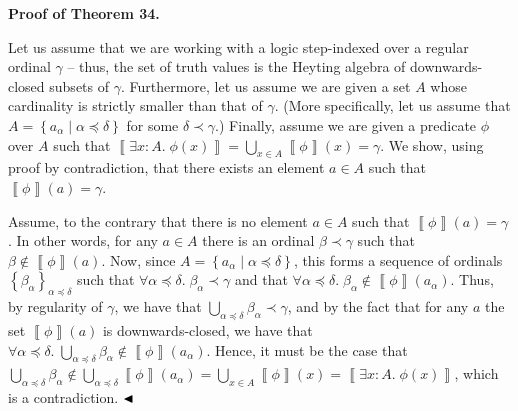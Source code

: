  
 
\par\medskip\noindent\textbf{Proof of Theorem 34.}\par
 
 
Let us assume that we are working with a logic step-indexed over a regular ordinal $\gamma$ – thus, the set of truth values is the Heyting algebra of downwards-closed subsets of $\gamma$. Furthermore, let us assume we are given a set $A$ whose cardinality is strictly smaller than that of $\gamma$. (More specifically, let us assume that $A=\left\{a_{\alpha}\middle|\alpha\preceq\delta\right\}$ for some $\delta\prec\gamma$.) Finally, assume we are given a predicate $\phi$ over $A$ such that $\left\llbracket\exists x:A.\;\phi(x)\right\rrbracket=\bigcup_{x\in A}\left\llbracket\phi\right\rrbracket(x)=\gamma$. We show, using proof by contradiction, that there exists an element $a\in A$ such that $\left\llbracket\phi\right\rrbracket(a)=\gamma$.\par
 
 
 
Assume, to the contrary that there is no element $a\in A$ such that $\left\llbracket\phi\right\rrbracket(a)=\gamma$. In other words, for any $a\in A$ there is an ordinal $\beta\prec\gamma$ such that $\beta\not\in\left\llbracket\phi\right\rrbracket(a)$. Now, since $A=\left\{a_{\alpha}\middle|\alpha\preceq\delta\right\}$, this forms a sequence of ordinals $\left\{\beta_{\alpha}\right\}_{\alpha\preceq\delta}$ such that $\forall\alpha\preceq\delta.\;\beta_{\alpha}\prec\gamma$ and that $\forall\alpha\preceq\delta.\;\beta_{\alpha}\not\in\left\llbracket\phi\right\rrbracket(a_{\alpha})$. Thus, by regularity of $\gamma$, we have that $\bigcup_{\alpha\preceq\delta}\beta_{\alpha}\prec\gamma$, and by the fact that for any $a$ the set $\left\llbracket\phi\right\rrbracket(a)$ is downwards-closed, we have that $\forall\alpha\preceq\delta.\;\bigcup_{\alpha\preceq\delta}\beta_{\alpha}\not\in\left\llbracket\phi\right\rrbracket(a_{\alpha})$. Hence, it must be the case that $\bigcup_{\alpha\preceq\delta}\beta_{\alpha}\not\in\bigcup_{\alpha\preceq\delta}\left\llbracket\phi\right\rrbracket(a_{\alpha})=\bigcup_{x\in A}\left\llbracket\phi\right\rrbracket(x)=\left\llbracket\exists x:A.\;\phi(x)\right\rrbracket$, which is a contradiction. $\hfill\blacktriangleleft$\par
 
